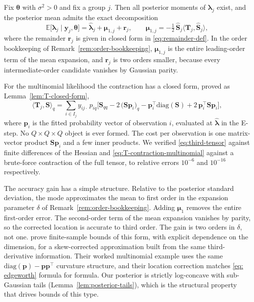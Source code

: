 \begin{proposition}
Fix $\bm{\theta}$ with $\sigma^{2}>0$ and fix a group $j$. Then all posterior moments of $\bm{\lambda}_{j}$ exist, and the posterior mean admits the exact decomposition
\begin{equation}
    \mathbb{E}\big[\bm{\lambda}_{j}\mid\bm{y}_{j},\bm{\theta}\big]=\hat{\bm{\lambda}}_{j}+\bm{\mu}_{1,j}+\bm{r}_{j},\qquad\bm{\mu}_{1,j}=-\tfrac{1}{2}\,\hat{\mathbf{S}}_{j}\big\langle\mathbf{T}_{j},\hat{\mathbf{S}}_{j}\big\rangle,
    \label{eq: edgeworth}
\end{equation}
where the remainder $\bm{r}_{j}$ is given in closed form in \eqref{eq:remainder-def}. In the order bookkeeping of Remark~\ref{rem:order-bookkeeping}, $\bm{\mu}_{1,j}$ is the entire leading-order term of the mean expansion, and $\bm{r}_{j}$ is two orders smaller, because every intermediate-order candidate vanishes by Gaussian parity.
\label{prop:edgeworth-mean}
\end{proposition}
For the multinomial likelihood the contraction has a closed form, proved as Lemma~\ref{lem:T-closed-form},
\begin{equation}
    \big\langle\mathbf{T}_{j},\mathbf{S}\big\rangle_{q}=\sum_{i\in I_{j}}y_{ij\cdot}\,p_{iq}\Big[\mathbf{S}_{qq}-2\,\big(\mathbf{S}\bm{p}_{i}\big)_{q}-\bm{p}_{i}^{\top}\mathrm{diag}(\mathbf{S})+2\,\bm{p}_{i}^{\top}\mathbf{S}\bm{p}_{i}\Big],
    \label{eq:T-contraction-multinomial}
\end{equation}
where $\bm{p}_{i}$ is the fitted probability vector of observation $i$, evaluated at $\hat{\bm{\lambda}}$ in the E-step. No $Q\times Q\times Q$ object is ever formed. The cost per observation is one matrix-vector product $\mathbf{S}\bm{p}_{i}$ and a few inner products. We verified \eqref{eq:third-tensor} against finite differences of the Hessian and \eqref{eq:T-contraction-multinomial} against a brute-force contraction of the full tensor, to relative errors $10^{-6}$ and $10^{-16}$ respectively.
 
The accuracy gain has a simple structure. Relative to the posterior standard deviation, the mode approximates the mean to first order in the expansion parameter $\delta$ of Remark~\ref{rem:order-bookkeeping}. Adding $\bm{\mu}_{1}$ removes the entire first-order error. The second-order term of the mean expansion vanishes by parity, so the corrected location is accurate to third order. The gain is two orders in $\delta$, not one. \citet{Katsevich2024} prove finite-sample bounds of this form, with explicit dependence on the dimension, for a skew-corrected approximation built from the same third-derivative information. Their worked multinomial example uses the same $\mathrm{diag}(\bm{p})-\bm{p}\bm{p}^{\top}$ curvature structure, and their location correction matches \eqref{eq: edgeworth} formula for formula. Our posterior is strictly log-concave with sub-Gaussian tails (Lemma~\ref{lem:posterior-tails}), which is the structural property that drives bounds of this type.
 
